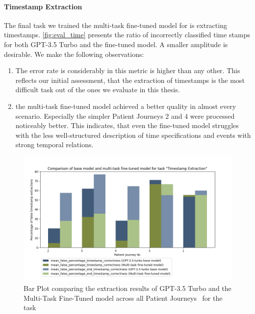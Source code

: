 \paragraph{Timestamp Extraction}
The final task we trained the multi-task fine-tuned model for is extracting timestamps. \autoref{fig:eval_time} presents the ratio of incorrectly classified time stamps for both GPT-3.5 Turbo and the fine-tuned model. A smaller amplitude is desirable. We make the following observations:
\begin{enumerate}
    \item The error rate is considerably in this metric is higher than any other. This reflects our initial assessment, that the extraction of timestamps is the most difficult task out of the ones we evaluate in this thesis.
    \item the multi-task fine-tuned model achieved a better quality in almost every scenario. Especially the simpler Patient Journeys 2 and 4 were processed noticeably better. This indicates, that even the fine-tuned model struggles with the less well-structured description of time specifications and events with strong temporal relations.
\end{enumerate}
\begin{figure}
    \centering
    \includegraphics[width=\textwidth]{bachelor_thesis/images/timestamp_all.png}
    \caption{Bar Plot comparing the extraction results of GPT-3.5 Turbo and the Multi-Task Fine-Tuned model across all Patient Journeys~ for the task }
    \label{fig:eval_time}
\end{figure}


